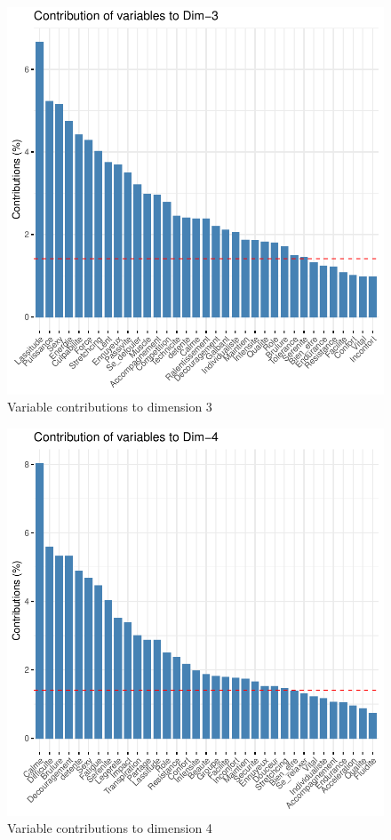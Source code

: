 \documentclass[12pt]{article}
\begin{document}
\begin{figure}[H]
\begin{center}
\includegraphics[scale=1.1]{ACP_3.pdf} 
\caption[]{Variable contributions to  dimension 3 }
\end{center}
\end{figure}


\begin{figure}[H]
\begin{center}
\includegraphics[scale=1.1]{ACP_4.pdf} 
\caption[]{Variable contributions to  dimension 4 }
\end{center}
\end{figure}
\end{document}
